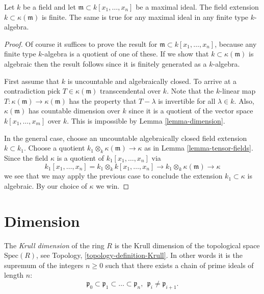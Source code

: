 \begin{theorem}
\label{theorem-nulstellensatz}
Let $k$ be a field and let $\mathfrak m \subset 
k[x_1,\ldots,x_n]$ be a maximal ideal.
The field extension $k \subset \kappa(\mathfrak m)$
is finite. The same is true for any maximal ideal in
any finite type $k$-algebra.
\end{theorem}

\begin{proof}
Of course it suffices to prove the result for $\mathfrak m \subset 
k[x_1,\ldots,x_n]$, because any finite type $k$-algebra is a
quotient of one of these. 
If we show that $k \subset \kappa(\mathfrak m)$
is algebraic then the result follows since it is
finitely generated as a $k$-algebra.

\medskip\noindent
First assume that $k$ is uncountable and algebraically closed.
To arrive at a contradiction pick
$T \in \kappa(\mathfrak m)$ transcendental over $k$.
Note that the $k$-linear map $T : \kappa(\mathfrak m)
\to \kappa(\mathfrak m)$ has the property that
$T - \lambda$ is invertible for all $\lambda \in k$.
Also, $\kappa(\mathfrak m)$ has countable dimension
over $k$ since it is a quotient of the vector space
$k[x_1,\ldots,x_m]$ over $k$.
This is impossible by Lemma \ref{lemma-dimension}.

\medskip\noindent
In the general case, choose an uncountable algebraically closed
field extension $k \subset k_1$. Choose a quotient
$k_1\otimes_k \kappa(\mathfrak m) \to \kappa$ as in
Lemma \ref{lemma-tensor-fields}. Since the field
$\kappa$ is a quotient of $k_1[x_1,\ldots,x_n]$ via
$$
k_1[x_1,\ldots,x_n]
=
k_1 \otimes_k k[x_1,\ldots,x_n]
\to 
k_1\otimes_k \kappa(\mathfrak m)
\to
\kappa
$$
we see that we may apply the previous case to conclude the
extension $k_1 \subset \kappa$ is algebraic. By our choice
of $\kappa$ we win.
\end{proof}

\section{Dimension}
\label{section-dimension}

\begin{definition}
\label{definition-Krull}
The {\it Krull dimension} of the ring $R$ is the 
Krull dimension of the topological space $\text{Spec}(R)$,
see Topology, \ref{topology-definition-Krull}.
In other words it is the supremum of the integers $n\geq 0$
such that there exists a chain of prime ideals of length $n$:
$$
\mathfrak p_0
\subset 
\mathfrak p_1
\subset
\ldots
\subset
\mathfrak p_n,\ \ 
\mathfrak p_i \not= \mathfrak p_{i+1}.
$$
\end{definition}

